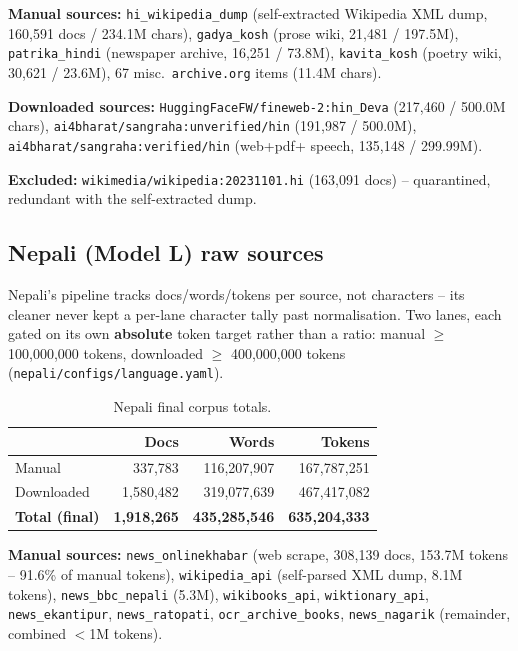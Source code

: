 \documentclass[11pt]{article}
\begin{document}
\textbf{Manual sources:} \texttt{hi\_wikipedia\_dump} (self-extracted
Wikipedia XML dump, 160{,}591 docs / 234.1M chars), \texttt{gadya\_kosh}
(prose wiki, 21{,}481 / 197.5M), \texttt{patrika\_hindi} (newspaper
archive, 16{,}251 / 73.8M), \texttt{kavita\_kosh} (poetry wiki, 30{,}621 /
23.6M), 67 misc.\ \texttt{archive.org} items (11.4M chars).

\textbf{Downloaded sources:} \texttt{HuggingFaceFW/fineweb-2:hin\_Deva}
(217{,}460 / 500.0M chars), \texttt{ai4bharat/sangraha:unverified/hin}
(191{,}987 / 500.0M), \texttt{ai4bharat/sangraha:verified/hin} (web+pdf+
speech, 135{,}148 / 299.99M).

\textbf{Excluded:} \texttt{wikimedia/wikipedia:20231101.hi} (163{,}091
docs) -- quarantined, redundant with the self-extracted dump.

\subsection{Nepali (Model L) raw sources}

Nepali's pipeline tracks docs/words/tokens per source, not characters --
its cleaner never kept a per-lane character tally past normalisation. Two
lanes, each gated on its own \textbf{absolute} token target rather than a
ratio: manual $\geq$ 100{,}000{,}000 tokens, downloaded $\geq$
400{,}000{,}000 tokens (\texttt{nepali/configs/language.yaml}).

\begin{table}[htbp]
\centering
\begin{tabular}{lrrr}
\toprule
& Docs & Words & Tokens \\
\midrule
Manual & 337{,}783 & 116{,}207{,}907 & 167{,}787{,}251 \\
Downloaded & 1{,}580{,}482 & 319{,}077{,}639 & 467{,}417{,}082 \\
\textbf{Total (final)} & \textbf{1{,}918{,}265} & \textbf{435{,}285{,}546} & \textbf{635{,}204{,}333} \\
\bottomrule
\end{tabular}
\caption{Nepali final corpus totals.}
\end{table}

\textbf{Manual sources:} \texttt{news\_onlinekhabar} (web scrape,
308{,}139 docs, 153.7M tokens -- 91.6\% of manual tokens),
\texttt{wikipedia\_api} (self-parsed XML dump, 8.1M tokens),
\texttt{news\_bbc\_nepali} (5.3M), \texttt{wikibooks\_api},
\texttt{wiktionary\_api}, \texttt{news\_ekantipur}, \texttt{news\_ratopati},
\texttt{ocr\_archive\_books}, \texttt{news\_nagarik} (remainder, combined
$<$1M tokens).
\end{document}
